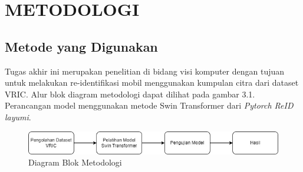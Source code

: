 \chapter{METODOLOGI}
\label{chap:metodologi}



\section{Metode yang Digunakan}
\label{sec:metodeyangdigunakan}

Tugas akhir ini merupakan penelitian di bidang visi komputer dengan tujuan untuk melakukan 
re-identifikasi mobil menggunakan kumpulan citra dari dataset VRIC. Alur blok diagram metodologi 
dapat dilihat pada gambar 3.1. Perancangan model menggunakan metode Swin Transformer dari 
\emph{Pytorch ReID layumi}.

\begin{figure}[ht]
  \centering
  \includegraphics[scale=0.65]{gambar/metodologiFix.jpg}
  \caption{Diagram Blok Metodologi}
  \label{fig:diagramblokmetodologi}
\end{figure}

